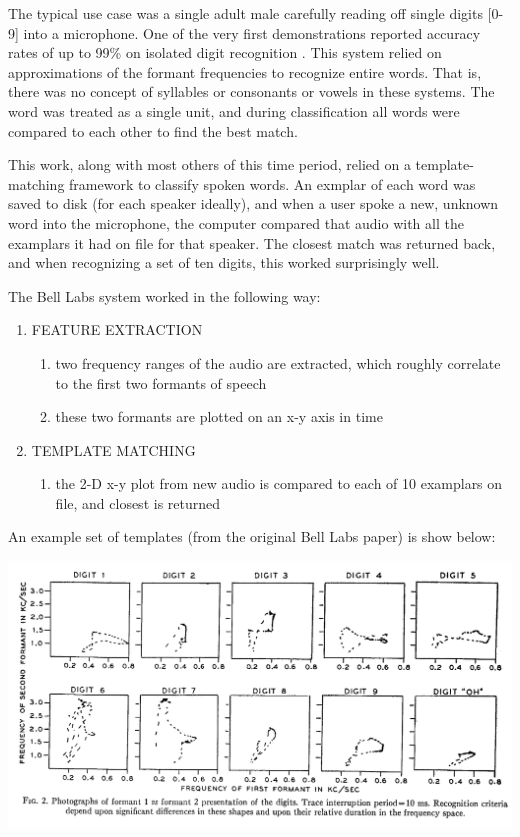 \documentclass[10pt,a4paper]{article}
\begin{document}
The typical use case was a single adult male carefully reading off single digits [0-9] into a microphone. One of the very first demonstrations reported accuracy rates of up to 99\% on isolated digit recognition \cite{davis1952automatic}. This system relied on approximations of the formant frequencies to recognize entire words. That is, there was no concept of syllables or consonants or vowels in these systems. The word was treated as a single unit, and during classification all words were compared to each other to find the best match.

This work, along with most others of this time period, relied on a template-matching framework to classify spoken words. An exmplar of each word was saved to disk (for each speaker ideally), and when a user spoke a new, unknown word into the microphone, the computer compared that audio with all the examplars it had on file for that speaker. The closest match was returned back, and when recognizing a set of ten digits, this worked surprisingly well. 

The Bell Labs system worked in the following way:

\begin{enumerate}
\item FEATURE EXTRACTION
  \begin{enumerate}
  \item two frequency ranges of the audio are extracted, which roughly correlate to the first two formants of speech
  \item these two formants are plotted on an x-y axis in time
  \end{enumerate}
  
\item TEMPLATE MATCHING
  \begin{enumerate}
  \item the 2-D x-y plot from new audio is compared to each of 10 examplars on file, and closest is returned
  \end{enumerate}
\end{enumerate}


An example set of templates (from the original Bell Labs paper) is show below:


\begin{center}
\includegraphics[width=.9\textwidth,keepaspectratio]{figs/digits.png}
\end{center}
\end{document}
